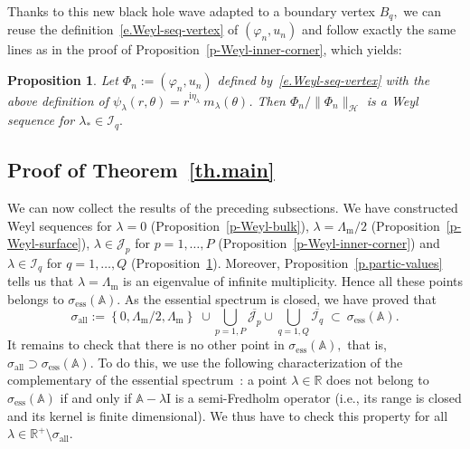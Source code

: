 \documentclass[11pt]{article}
\newtheorem{prop}[theo]{Proposition}
\theoremstyle{definition}
\numberwithin{equation}{section}
\numberwithin{figure}{section}
\numberwithin{table}{section}
\DeclareMathOperator{\ess}{ess}
\DeclareMathOperator{\all}{all}
\newcommand{\calH}{\mathcal{H}}
\newcommand{\calI}{\mathcal{I}}
\newcommand{\calJ}{\mathcal{J}}
\newcommand{\bbA}{\mathbb{A}}
\newcommand{\bbR}{\mathbb{R}}
\newcommand{\rmi}{{\mathrm{i}}}
\newcommand{\Ident}{{\mathrm{I}}}
\newcommand{\Lm}{{\Lambda_{\mathrm{m}}}}
\begin{document}
Thanks to this new black hole wave adapted to a boundary vertex $B_q,$ we can reuse the definition~\eqref{e.Weyl-seq-vertex} of $(\varphi_n,u_n)$ and follow exactly the same lines as in the proof of Proposition~\ref{p-Weyl-inner-corner}, which yields:

\begin{prop}\label{p-Weyl-boundary-corner}
Let $\Phi_n := (\varphi_n,u_n)$ defined by~\eqref{e.Weyl-seq-vertex} with the above definition of $\psi_\lambda(r,\theta) = r^{\rmi\eta_\lambda}\ m_\lambda(\theta)$. Then $\Phi_n/\|\Phi_n\|_\calH$ is a Weyl sequence for $\lambda_* \in \calI_q.$
\end{prop}

\subsection{Proof of Theorem~\ref{th.main}}\label{s.proof-thm}
We can now collect the results of the preceding subsections. We have constructed Weyl sequences for $\lambda = 0$ (Proposition~\ref{p-Weyl-bulk}), $\lambda = \Lm/2$ (Proposition~\ref{p-Weyl-surface}), $\lambda \in \calJ_p$ for $p=1,\ldots,P$ (Proposition~\ref{p-Weyl-inner-corner}) and $\lambda \in \calI_q$ for $q=1,\ldots,Q$ (Proposition~\ref{p-Weyl-boundary-corner}). Moreover, Proposition~\ref{p.partic-values} tells us that $\lambda = \Lm$ is an eigenvalue of infinite multiplicity. Hence all these points belongs to $\sigma_{\ess}(\bbA).$ As the essential spectrum is closed, we have proved that
\[
\sigma_{\all} := \left\{0,\Lm/2,\Lm\right\} \; \cup \bigcup_{p=1,P} \overline{\calJ_p} \cup \bigcup_{q=1,Q} \overline{\calI_q} \; \subset\ \sigma_{\ess}(\bbA).
\]
It remains to check that there is no other point in $\sigma_{\ess}(\bbA),$ that is, $\sigma_{\all} \supset \sigma_{\ess}(\bbA).$ To do this, we use the following characterization of the complementary of the essential spectrum~\cite{Edm-Eva-87}: a point $\lambda \in \bbR$ does not belong to $\sigma_{\ess}(\bbA)$ if and only if $\bbA - \lambda \Ident$ is a semi-Fredholm operator (i.e., its range is closed and its kernel is finite dimensional). We thus have to check this property for all $\lambda \in \bbR^{+}\setminus\sigma_{\all}.$
\end{document}
